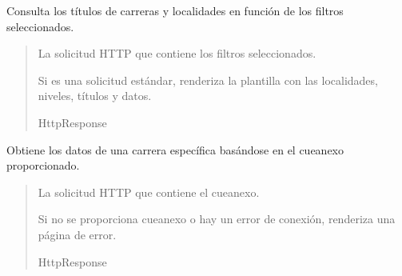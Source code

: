 \documentclass[letterpaper,10pt,spanish]{sphinxmanual}
\begin{document}
\begin{fulllineitems}

\pysigstartsignatures
{}
\pysigstopsignatures
\sphinxAtStartPar
Consulta los títulos de carreras y localidades en función de los filtros seleccionados.
\begin{quote}\begin{description}
\sphinxAtStartPar
{} \textendash{} La solicitud HTTP que contiene los filtros seleccionados.

\sphinxAtStartPar
\begin{description}
\sphinxAtStartPar
Si es una solicitud estándar, renderiza la plantilla con las localidades, niveles, títulos y datos.

\end{description}


\sphinxAtStartPar
HttpResponse

\end{description}\end{quote}

\end{fulllineitems}



\begin{fulllineitems}

\pysigstartsignatures
{}
\pysigstopsignatures
\sphinxAtStartPar
Obtiene los datos de una carrera específica basándose en el cueanexo proporcionado.
\begin{quote}\begin{description}
\sphinxAtStartPar
{} \textendash{} La solicitud HTTP que contiene el cueanexo.

\sphinxAtStartPar
\begin{description}
\sphinxAtStartPar
Si no se proporciona cueanexo o hay un error de conexión, renderiza una página de error.

\end{description}


\sphinxAtStartPar
HttpResponse

\end{description}\end{quote}

\end{fulllineitems}
\end{document}
